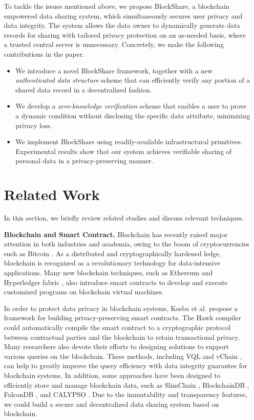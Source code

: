 \documentclass[11pt,divpdfm]{article}
\begin{document}
To tackle the issues mentioned above, we propose BlockShare, a blockchain empowered data sharing system, which simultaneously secures user privacy and data integrity.
The system allows the data owner to dynamically generate data records for sharing with tailored privacy protection on an as-needed basis, where a trusted central server is unnecessary.
Concretely, we make the following contributions in the paper.
\begin{itemize}
	\item
	We introduce a novel BlockShare framework, together with a new \emph{authenticated data structure} scheme that can efficiently verify any portion of a shared data record in a decentralized fashion.
	\item
	We develop a \emph{zero-knowledge verification} scheme that enables a user to prove a dynamic condition without disclosing the specific data attribute, minimizing privacy loss.
	\item
	We implement BlockShare using readily-available infrastructural primitives.
	Experimental results show that our system achieves verifiable sharing of personal data in a privacy-preserving manner.
\end{itemize}



\section{Related Work}
In this section, we briefly review related studies and discuss relevant techniques.

\textbf{Blockchain and Smart Contract.}
Blockchain has recently raised major attention in both industries and academia, owing to the boom of cryptocurrencies such as Bitcoin \cite{nakamoto2008bitcoin}.
As a distributed and cryptographically hardened ledge, blockchain is recognized as a revolutionary technology for data-intensive applications.
Many new blockchain techniques, such as Ethereum \cite{Ethereum} and Hyperledger fabric \cite{androulaki2018hyperledger}, also introduce smart contracts to develop and execute customized programs on blockchain virtual machines.

In order to protect data privacy in blockchain systems, Kosba et al. \cite{kosba2016hawk} propose a framework for building privacy-preserving smart contracts.
The Hawk compiler could automatically compile the smart contract to a cryptographic protocol between contractual parties and the blockchain to retain transactional privacy.
Many researchers also devote their efforts to designing solutions to support various queries on the blockchain.
These methods, including VQL \cite{wu2021vql} and vChain \cite{xu2019vchain}, can help to greatly improve the query efficiency with data integrity guarantee for blockchain systems.
In addition, some approaches have been designed to efficiently store and manage blockchain data, such as SlimChain \cite{xu2021slimchain}, BlockchainDB \cite{el2019blockchaindb}, FalconDB \cite{peng2020falcondb}, and CALYPSO \cite{kokoris2020calypso}.
Due to the immutability and transparency features, we could build a secure and decentralized data sharing system based on blockchain.
\end{document}
